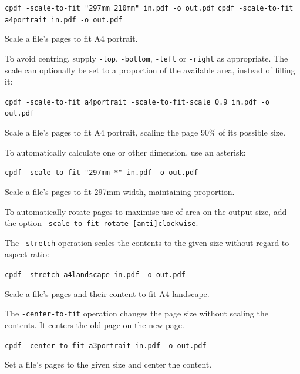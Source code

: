 \documentclass{book}
\begin{document}
  \begin{framed}
  \small\noindent\verb!cpdf -scale-to-fit "297mm 210mm" in.pdf -o out.pdf!
  \small\noindent\verb!cpdf -scale-to-fit a4portrait in.pdf -o out.pdf!

  \vspace{2.5mm}
  \noindent Scale a file's pages to fit A4 portrait.
  \end{framed}
  
\noindent To avoid centring, supply \texttt{-top}, \texttt{-bottom}, \texttt{-left} or \texttt{-right} as appropriate. The scale can optionally be set to a proportion of the available area, instead of filling it:

  \begin{framed}
  \small\noindent\verb!cpdf -scale-to-fit a4portrait -scale-to-fit-scale 0.9 in.pdf -o out.pdf!

  \vspace{2.5mm}
  \noindent Scale a file's pages to fit A4 portrait, scaling the page 90\% of its possible size.
  \end{framed}


\noindent To automatically calculate one or other dimension, use an asterisk:

  \begin{framed}
  \small\noindent\verb!cpdf -scale-to-fit "297mm *" in.pdf -o out.pdf!

  \vspace{2.5mm}
  \noindent Scale a file's pages to fit 297mm width, maintaining proportion.
  \end{framed}

\noindent To automatically rotate pages to maximise use of area on the output size, add the option \texttt{-scale-to-fit-rotate-[anti]clockwise}.

The \texttt{-stretch} operation scales the contents to the given size without regard to aspect ratio:

  \begin{framed}
  \small\noindent\verb!cpdf -stretch a4landscape in.pdf -o out.pdf!

  \vspace{2.5mm}
  \noindent Scale a file's pages and their content to fit A4 landscape.
  \end{framed}

\noindent The \texttt{-center-to-fit} operation changes the page size without scaling the contents. It centers the old page on the new page.

  \begin{framed}
  \small\noindent\verb!cpdf -center-to-fit a3portrait in.pdf -o out.pdf!

  \vspace{2.5mm}
  \noindent Set a file's pages to the given size and center the content.
  \end{framed}
\end{document}
